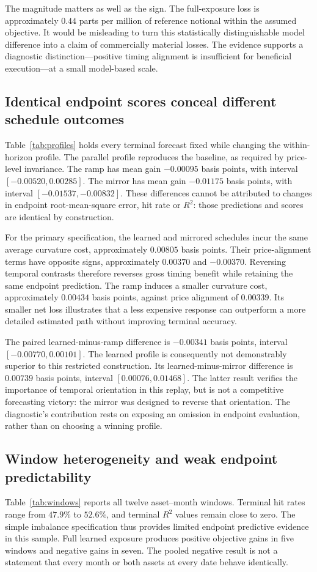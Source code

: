 The magnitude matters as well as the sign. The full-exposure loss is approximately $0.44$ parts per million of reference notional within the assumed objective. It would be misleading to turn this statistically distinguishable model difference into a claim of commercially material losses. The evidence supports a diagnostic distinction---positive timing alignment is insufficient for beneficial execution---at a small model-based scale.

\subsection{Identical endpoint scores conceal different schedule outcomes}
Table~\ref{tab:profiles} holds every terminal forecast fixed while changing the within-horizon profile. The parallel profile reproduces the baseline, as required by price-level invariance. The ramp has mean gain $-0.00095$ basis points, with interval $[-0.00520,0.00285]$. The mirror has mean gain $-0.01175$ basis points, with interval $[-0.01537,-0.00832]$. These differences cannot be attributed to changes in endpoint root-mean-square error, hit rate or $R^2$: those predictions and scores are identical by construction.

For the primary specification, the learned and mirrored schedules incur the same average curvature cost, approximately $0.00805$ basis points. Their price-alignment terms have opposite signs, approximately $0.00370$ and $-0.00370$. Reversing temporal contrasts therefore reverses gross timing benefit while retaining the same endpoint prediction. The ramp induces a smaller curvature cost, approximately $0.00434$ basis points, against price alignment of $0.00339$. Its smaller net loss illustrates that a less expensive response can outperform a more detailed estimated path without improving terminal accuracy.

The paired learned-minus-ramp difference is $-0.00341$ basis points, interval $[-0.00770,0.00101]$. The learned profile is consequently not demonstrably superior to this restricted construction. Its learned-minus-mirror difference is $0.00739$ basis points, interval $[0.00076,0.01468]$. The latter result verifies the importance of temporal orientation in this replay, but is not a competitive forecasting victory: the mirror was designed to reverse that orientation. The diagnostic's contribution rests on exposing an omission in endpoint evaluation, rather than on choosing a winning profile.

\subsection{Window heterogeneity and weak endpoint predictability}
Table~\ref{tab:windows} reports all twelve asset--month windows. Terminal hit rates range from $47.9\%$ to $52.6\%$, and terminal $R^2$ values remain close to zero. The simple imbalance specification thus provides limited endpoint predictive evidence in this sample. Full learned exposure produces positive objective gains in five windows and negative gains in seven. The pooled negative result is not a statement that every month or both assets at every date behave identically.


